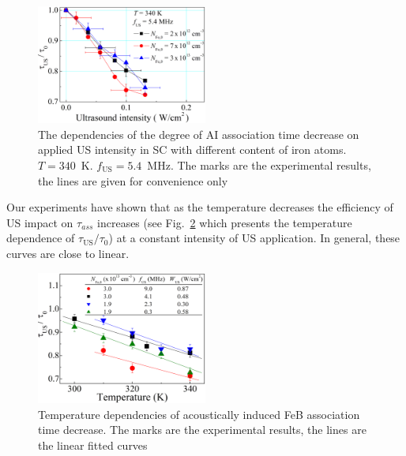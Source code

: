 \documentclass[sn-mathphys]{sn-jnl}%
\theoremstyle{thmstyleone}%
\theoremstyle{thmstyletwo}%
\theoremstyle{thmstylethree}%
\begin{document}
\begin{figure}
\centering
 \includegraphics[width=0.5\textwidth]{Fig5}
\caption{
The dependencies of the degree of AI association time decrease on applied US intensity
in SC with different content of iron atoms.
$T=340$~K.
$f_\mathrm{US}=5.4$~MHz.
The marks are the experimental results, the lines are given for convenience only
}
\label{figNFe}       %
\end{figure}

Our experiments have shown that
as the temperature decreases the efficiency of US impact on $\tau_{ass}$ increases
(see Fig.~\ref{figTemp} which presents the temperature dependence of $\tau_\mathrm{US}/\tau_{0}$)
at a constant intensity of US application.
In general, these curves are close to linear.

\begin{figure}
\centering
 \includegraphics[width=0.5\textwidth]{Fig6}
\caption{
Temperature dependencies of  acoustically induced FeB association time decrease.
The marks are the experimental results, the lines are the linear fitted curves
}
\label{figTemp}       %
\end{figure}
\end{document}
